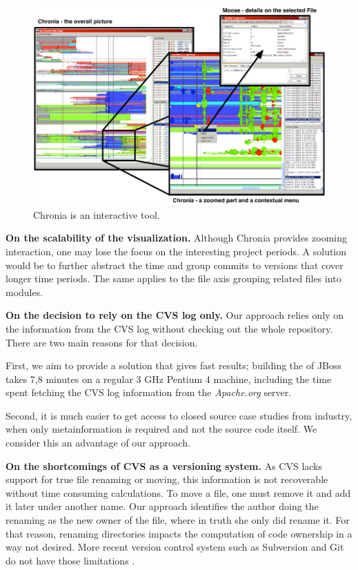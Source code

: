 \begin{figure}[htbp]
\begin{center}
\includegraphics[width=\linewidth]{fig/chronia-screenshot}
\caption{Chronia is an interactive tool.}
\label{fig:chronia}
\end{center}
\end{figure}

\textbf{On the scalability of the visualization.} Although Chronia provides zooming interaction, one may lose the focus on the interesting project periods. A solution would be to further abstract the time and group commits to versions that cover longer time periods. The same applies to the file axis grouping related files into modules.

\textbf{On the decision to rely on the CVS log only.} Our approach relies only on the information from the CVS log without checking out the whole repository. There are two main reasons for that decision.

First, we aim to provide a solution that gives fast results; \eg building the \omap of JBoss takes 7,8 minutes on a regular 3 GHz Pentium 4 machine, including the time spent fetching the CVS log information from the \textit{Apache.org} server.

Second, it is much easier to get access to closed source case studies from industry, when only metainformation is required and not the source code itself. We consider this an advantage of our approach.

\textbf{On the shortcomings of CVS as a versioning system.} As CVS lacks support for true file renaming or moving, this information is not recoverable without time consuming calculations. To move a file, one must remove it and add it later under another name. Our approach identifies the author doing the renaming as the new owner of the file, where in truth she only did rename it. For that reason, renaming directories impacts the computation of code ownership in a way not desired. More recent version control system such as Subversion and Git do not have  those limitations \cite{citeulike:5416084}.

